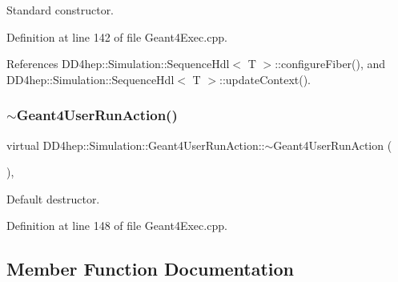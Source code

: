 Standard constructor. 



Definition at line 142 of file Geant4\+Exec.\+cpp.



References D\+D4hep\+::\+Simulation\+::\+Sequence\+Hdl$<$ T $>$\+::configure\+Fiber(), and D\+D4hep\+::\+Simulation\+::\+Sequence\+Hdl$<$ T $>$\+::update\+Context().

\hypertarget{class_d_d4hep_1_1_simulation_1_1_geant4_user_run_action_a5b3bda44a46cc253d0c1d343d4f28738}{}\label{class_d_d4hep_1_1_simulation_1_1_geant4_user_run_action_a5b3bda44a46cc253d0c1d343d4f28738} 
\subsubsection{\texorpdfstring{$\sim$\+Geant4\+User\+Run\+Action()}{~Geant4UserRunAction()}}
{\footnotesize\ttfamily virtual D\+D4hep\+::\+Simulation\+::\+Geant4\+User\+Run\+Action\+::$\sim$\+Geant4\+User\+Run\+Action (\begin{DoxyParamCaption}{ }\end{DoxyParamCaption})\hspace{0.3cm}{\ttfamily [inline]}, {\ttfamily [virtual]}}



Default destructor. 



Definition at line 148 of file Geant4\+Exec.\+cpp.



\subsection{Member Function Documentation}
\hypertarget{class_d_d4hep_1_1_simulation_1_1_geant4_user_run_action_a42955d00dd5a101ec3e9594645eac6e5}{}\label{class_d_d4hep_1_1_simulation_1_1_geant4_user_run_action_a42955d00dd5a101ec3e9594645eac6e5} 
